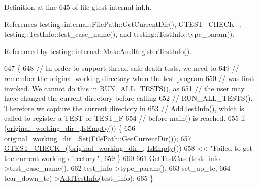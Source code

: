 Definition at line 645 of file gtest-\/internal-\/inl.\+h.



References testing\+::internal\+::\+File\+Path\+::\+Get\+Current\+Dir(), G\+T\+E\+S\+T\+\_\+\+C\+H\+E\+C\+K\+\_\+, testing\+::\+Test\+Info\+::test\+\_\+case\+\_\+name(), and testing\+::\+Test\+Info\+::type\+\_\+param().



Referenced by testing\+::internal\+::\+Make\+And\+Register\+Test\+Info().


\begin{DoxyCode}
647                                         \{
648     \textcolor{comment}{// In order to support thread-safe death tests, we need to}
649     \textcolor{comment}{// remember the original working directory when the test program}
650     \textcolor{comment}{// was first invoked.  We cannot do this in RUN\_ALL\_TESTS(), as}
651     \textcolor{comment}{// the user may have changed the current directory before calling}
652     \textcolor{comment}{// RUN\_ALL\_TESTS().  Therefore we capture the current directory in}
653     \textcolor{comment}{// AddTestInfo(), which is called to register a TEST or TEST\_F}
654     \textcolor{comment}{// before main() is reached.}
655     \textcolor{keywordflow}{if} (\hyperlink{classtesting_1_1internal_1_1UnitTestImpl_aaf1f1d4cbb2f681ded9bbf4c6075430c}{original\_working\_dir\_}.\hyperlink{classtesting_1_1internal_1_1FilePath_a2c165c5510e8705ade547849a9234a6e}{IsEmpty}()) \{
656       \hyperlink{classtesting_1_1internal_1_1UnitTestImpl_aaf1f1d4cbb2f681ded9bbf4c6075430c}{original\_working\_dir\_}.\hyperlink{classtesting_1_1internal_1_1FilePath_a15a42de7518e89254e0640dd9317d5f7}{Set}(\hyperlink{classtesting_1_1internal_1_1FilePath_aaff39ccd7bfb7a1c09c0220a64326387}{FilePath::GetCurrentDir}());
657       \hyperlink{gtest-port_8h_ab54343f0a36dc4cb0ce8a478dd7847b8}{GTEST\_CHECK\_}(!\hyperlink{classtesting_1_1internal_1_1UnitTestImpl_aaf1f1d4cbb2f681ded9bbf4c6075430c}{original\_working\_dir\_}.
      \hyperlink{classtesting_1_1internal_1_1FilePath_a2c165c5510e8705ade547849a9234a6e}{IsEmpty}())
658           << \textcolor{stringliteral}{"Failed to get the current working directory."};
659     \}
660 
661     \hyperlink{classtesting_1_1internal_1_1UnitTestImpl_a6438e18ea4904d239a3db7b036a52229}{GetTestCase}(test\_info->test\_case\_name(),
662                 test\_info->type\_param(),
663                 set\_up\_tc,
664                 tear\_down\_tc)->\hyperlink{classtesting_1_1internal_1_1UnitTestImpl_a1cc87dfc91377ebec4a3ff4192dfcba9}{AddTestInfo}(test\_info);
665   \}
\end{DoxyCode}
